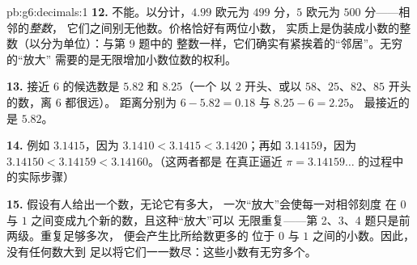 \begin{solution}{pb:g6:decimals:1}
\textbf{12.} 不能。以分计，$4.99$ 欧元为 $499$ 分，$5$
欧元为 $500$ 分——相邻的\emph{整数}，
它们之间别无他数。价格恰好有两位小数，
实质上是伪装成小数的整数（以分为单位）：与第 9 题中的
整数一样，它们确实有紧挨着的“邻居”。无穷的“放大”
需要的是无限增加小数位数的权利。

\textbf{13.} 接近 $6$ 的候选数是 $5.82$ 和 $8.25$（一个
以 $2$ 开头、或以 $58$、$25$、$82$、$85$ 开头的数，离 $6$ 都很远）。
距离分别为 $6 - 5.82 = 0.18$ 与 $8.25 - 6 = 2.25$。
最接近的是 $5.82$。

\textbf{14.} 例如 $3.1415$，因为
$3.1410 < 3.1415 < 3.1420$；再如 $3.14159$，因为
$3.14150 < 3.14159 < 3.14160$。（这两者都是
在真正逼近 $\pi = 3.14159\dots$ 的过程中的实际步骤）

\textbf{15.} 假设有人给出一个数，无论它有多大，
一次“放大”会使每一对相邻刻度
在 $0$ 与 $1$ 之间变成九个新的数，且这种“放大”可以
无限重复——第 2、3、4 题只是前两级。重复足够多次，
便会产生比所给数更多的
位于 $0$ 与 $1$ 之间的小数。因此，没有任何数大到
足以将它们一一数尽：这些小数有无穷多个。
\end{solution}
